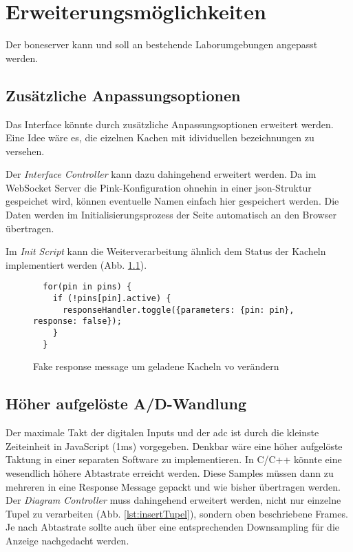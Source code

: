 \chapter{Erweiterungsmöglichkeiten}
Der boneserver kann und soll an bestehende Laborumgebungen angepasst werden.


\section{Zusätzliche Anpassungsoptionen}
Das Interface könnte durch zusätzliche Anpassungsoptionen erweitert werden. Eine Idee wäre es, die eizelnen Kachen mit idividuellen bezeichnungen zu versehen.

Der \textit{Interface Controller} kann dazu dahingehend erweitert werden. Da im WebSocket Server die Pink-Konfiguration ohnehin in einer \gls{json}-Struktur gespeichet wird, können eventuelle Namen einfach hier gespeichert werden. Die Daten werden im Initialisierungsprozess der Seite automatisch an den Browser übertragen.

Im \textit{Init Script} kann die Weiterverarbeitung ähnlich dem Status der Kacheln implementiert werden (Abb. \ref{lst:fakeResponseMessage}).

\begin{figure}[H]
  \begin{lstlisting}
  for(pin in pins) {
    if (!pins[pin].active) {
      responseHandler.toggle({parameters: {pin: pin}, response: false});
    }
  }
  \end{lstlisting}
  \caption{Fake response message um geladene Kacheln vo verändern}
  \label{lst:fakeResponseMessage}
\end{figure}


\section{Höher aufgelöste A/D-Wandlung}
Der maximale Takt der digitalen Inputs und der \gls{adc} ist durch die kleinste Zeiteinheit in JavaScript (1ms) vorgegeben. Denkbar wäre eine höher aufgelöste Taktung in einer separaten Software zu implementieren. In C/C++ könnte eine wesendlich höhere Abtastrate erreicht werden. Diese Samples müssen dann zu mehreren in eine Response Message gepackt und wie bisher übertragen werden.\\

Der \textit{Diagram Controller} muss dahingehend erweitert werden, nicht nur einzelne Tupel zu verarbeiten (Abb. \ref{lst:insertTupel}), sondern oben beschriebene Frames. Je nach Abtastrate sollte auch über eine entsprechenden Downsampling für die Anzeige nachgedacht werden.

